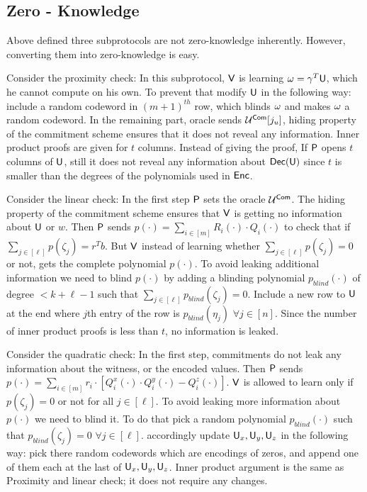 \subsection{Zero - Knowledge}\label{subsec:zeroknowledge}
Above defined three subprotocols are not zero-knowledge inherently. However, converting them into zero-knowledge is easy. 

Consider the proximity check: In this subprotocol, $\mathsf{V}$ is learning $\omega = \gamma^T\mathsf{U}$, which he cannot compute on his own. To prevent that modify $\mathsf{U}$ in the following way: include a random codeword in $(m+1)^{th}$ row, which blinds $\omega$ and makes $\omega$ a random codeword. 
In the remaining part, oracle sends $\mathcal{U}^{\mathsf{Com}}[j_u]$, hiding property of the commitment scheme ensures that it does not reveal any information.
Inner product proofs are given for $t$ columns. Instead of giving the proof, If $\mathsf{P}$ opens $t$ columns of $\mathsf{U}$, still it does not reveal any information about $\mathsf{Dec}(\mathsf{U})$ since $t$ is smaller than the degrees of the polynomials used in $\mathsf{Enc}$.

Consider the linear check: In the first step $\mathsf{P}$ sets the oracle $\mathcal{U}^{\mathsf{Com}}$. The hiding property of the commitment scheme ensures that $\mathsf{V}$ is getting no information about $\mathsf{U}$ or $w$.
Then $\mathsf{P}$ sends $p(\cdot) = \sum_{i\in[m]} R_i (\cdot) \cdot Q_i(\cdot)$ to check that if $\sum_{j\in [\ell]} p(\zeta_j) = r^Tb$. But $\mathsf{V}$ instead of learning whether $\sum_{j\in[\ell]} p(\zeta_j) = 0$ or not, gets the complete polynomial $p(\cdot)$. To avoid leaking additional information we need to blind $p(\cdot)$ by adding a blinding polynomial $p_{blind}(\cdot)$ of degree $< k + \ell - 1$ such that $\sum_{j\in[\ell]} p_{blind}(\zeta_j) = 0$. Include a new row to $\mathsf{U}$ at the end where $j$th entry of the row is $p_{blind}(\eta_j)$ $\forall j\in [n]$.
Since the number of inner product proofs is less than $t$, no information is leaked.

Consider the quadratic check: In the first step, commitments do not leak any information about the witness, or the encoded values.
Then $\mathsf{P}$ sends $p(\cdot) = \sum_{i\in[m]} r_i\cdot [Q^x_i(\cdot)\cdot Q^y_i(\cdot) - Q^z_i(\cdot)]$. $\mathsf{V}$ is allowed to learn only if $p(\zeta_j)=0$ or not for all $j\in[\ell]$. To avoid leaking more information about $p(\cdot)$ we need to blind it. To do that pick a random polynomial $p_{blind}(\cdot)$ such that $p_{blind}(\zeta_j) = 0$ $\forall j\in [\ell]$. accordingly update $\mathsf{U}_x, \mathsf{U}_y,\mathsf{U}_z$ in the following way: pick there random codewords which are encodings of zeros, and append one of them each at the last of $\mathsf{U}_{x}, \mathsf{U}_{y}, \mathsf{U}_{z}$.
Inner product argument is the same as Proximity and linear check; it does not require any changes. 

